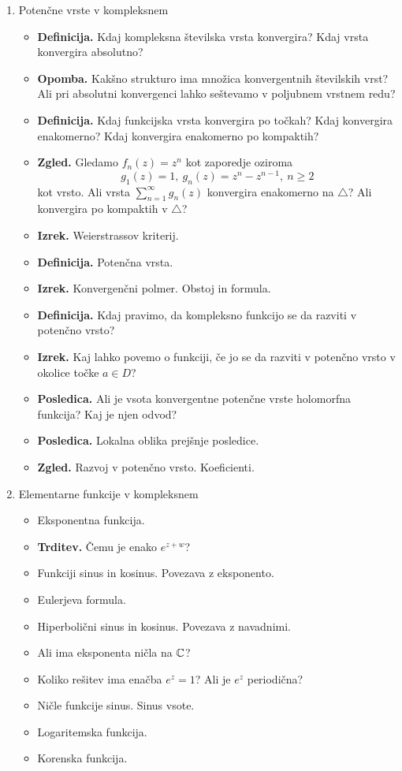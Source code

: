 \begin{enumerate}
    \item Potenčne vrste v kompleksnem
    \begin{itemize}
        \item \textbf{Definicija.} Kdaj kompleksna številska vrsta konvergira? Kdaj vrsta konvergira absolutno?
        \item \textbf{Opomba.} Kakšno strukturo ima množica konvergentnih številskih vrst? Ali pri absolutni konvergenci lahko seštevamo v poljubnem vrstnem redu?
        \item \textbf{Definicija.} Kdaj funkcijska vrsta konvergira po točkah? Kdaj konvergira enakomerno? Kdaj konvergira enakomerno po kompaktih?
        \item \textbf{Zgled.} Gledamo \(f_n(z) = z^n\) kot zaporedje oziroma 
        \[g_1(z) = 1, \ g_n(z) = z^n - z^{n-1}, \ n \geq 2\]
        kot vrsto. Ali vrsta \(\sum_{n=1}^{\infty} g_n(z)\) konvergira enakomerno na \(\triangle\)? Ali konvergira po kompaktih v \(\triangle\)? 
        \item \textbf{Izrek.} Weierstrassov kriterij.
        \item \textbf{Definicija.} Potenčna vrsta.
        \item \textbf{Izrek.} Konvergenčni polmer. Obstoj in formula.
        \item \textbf{Definicija.} Kdaj pravimo, da kompleksno funkcijo se da razviti v potenčno vrsto?
        \item \textbf{Izrek.} Kaj lahko povemo o funkciji, če jo se da razviti v potenčno vrsto v okolice točke \(a \in D\)?
        \item \textbf{Posledica.} Ali je vsota konvergentne potenčne vrste holomorfna funkcija? Kaj je njen odvod?
        \item \textbf{Posledica.} Lokalna oblika prejšnje posledice.
        \item \textbf{Zgled.} Razvoj v potenčno vrsto. Koeficienti.
    \end{itemize}

    \item Elementarne funkcije v kompleksnem
    \begin{itemize}
        \item Eksponentna funkcija.
        \item \textbf{Trditev.} Čemu je enako \(e^{z+w}\)?
        \item Funkciji sinus in kosinus. Povezava z eksponento. 
        \item Eulerjeva formula.
        \item Hiperbolični sinus in kosinus. Povezava z navadnimi.
        \item Ali ima eksponenta ničla na \(\mathbb{C}\)?
        \item Koliko rešitev ima enačba \(e^z=1\)? Ali je \(e^z\) periodična?
        \item Ničle funkcije sinus. Sinus vsote.
        \item Logaritemska funkcija.
        \item Korenska funkcija.
    \end{itemize}


\end{enumerate}
